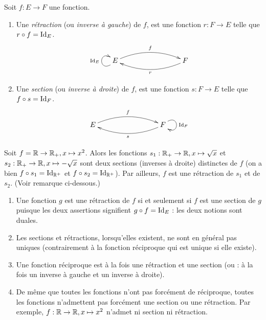 \begin{definition}
Soit $f : E\to F$ une fonction.
\begin{enumerate}
\item Une \emph{rétraction} (ou \emph{inverse à gauche}) de $f$, est une fonction $r:F\to E$ telle que $r\circ f = \operatorname{Id}_E$.
\[
\xymatrix{
 E \ar@(dl,ul)^{\Id_E} \ar@/^1pc/[rrr]^{f}
& & & 
\ar@/^1pc/[lll]^{r}  F 
}
\]
\item Une \emph{section} (ou \emph{inverse à droite}) de $f$, est une fonction $s:F\to E$ telle que $f \circ s = \operatorname{Id}_F$.
\[
\xymatrix{
 E  \ar@/^1pc/[rrr]^{f} 
& & & 
\ar@/^1pc/[lll]^{s}  F \ar@(ur,dr)^{\Id_F}
}
\]
\end{enumerate}
\end{definition}

\begin{exemple}
Soit $f = \mathbb{R}\to \mathbb{R}_+, x\mapsto x^2$. Alors les fonctions $s_1 : \mathbb{R}_+\to \mathbb{R}, x\mapsto \sqrt x$ et $s_2 : \mathbb{R}_+\to \mathbb{R}, x\mapsto -\sqrt x$ sont deux sections (inverses à droite) distinctes de $f$ (on a bien $f\circ s_1 = \operatorname{Id}_{\mathbb{R}^+}$ et $f\circ s_2 = \operatorname{Id}_{\mathbb{R}^+}$). 
Par ailleurs, $f$ est une rétraction de $s_1$ et de $s_2$. (Voir remarque ci-dessous.)
\end{exemple}

\begin{remarque}
\begin{enumerate}
\item Une fonction $g$ est une rétraction de $f$ si et seulement si $f$ est une section de $g$ puisque les deux assertions signifient $g\circ f = \operatorname{Id}_E$ : les deux notions sont \og duales\fg.
\item Les sections et rétractions, lorsqu'elles existent, ne sont en général pas uniques (contrairement à la fonction réciproque qui est unique si elle existe).
\item Une fonction réciproque est à la fois une rétraction et une section (ou : à la fois un inverse à gauche et un inverse à droite).
\item De même que toutes les fonctions n'ont pas forcément de réciproque, toutes les fonctions n'admettent pas forcément une section ou une rétraction. Par exemple, $f : \mathbb{R}\to \mathbb{R}, x\mapsto x^2$ n'admet ni section ni rétraction. 
\end{enumerate}
\end{remarque}

